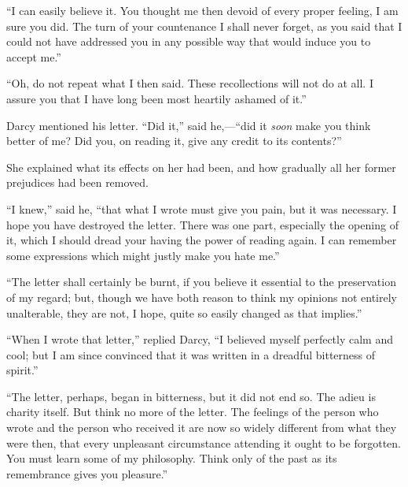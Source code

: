 ``I can easily believe it. You thought me then devoid of every proper feeling, I am sure you did. The turn of your countenance I shall never forget, as you said that I could not have addressed you in any possible way that would induce you to accept me.''

``Oh, do not repeat what I then said. These recollections will not do at all. I assure you that I have long been most heartily ashamed of it.''

Darcy mentioned his letter. ``Did it,'' said he,---``did it \textit{soon} make you think better of me? Did you, on reading it, give any credit to its contents?''

She explained what its effects on her had been, and how gradually all her former prejudices had been removed.

``I knew,'' said he, ``that what I wrote must give you pain, but it was necessary. I hope you have destroyed the letter. There was one part, especially the opening of it, which I should dread your having the power of reading again. I can remember some expressions which might justly make you hate me.''

``The letter shall certainly be burnt, if you believe it essential to the preservation of my regard; but, though we have both reason to think my opinions not entirely unalterable, they are not, I hope, quite so easily changed as that implies.''

``When I wrote that letter,'' replied Darcy, ``I believed myself perfectly calm and cool; but I am since convinced that it was written in a dreadful bitterness of spirit.''

``The letter, perhaps, began in bitterness, but it did not end so. The adieu is charity itself. But think no more of the letter. The feelings of the person who wrote and the person who received it are now so widely different from what they were then, that every unpleasant circumstance attending it ought to be forgotten. You must learn some of my philosophy. Think only of the past as its remembrance gives you pleasure.''

